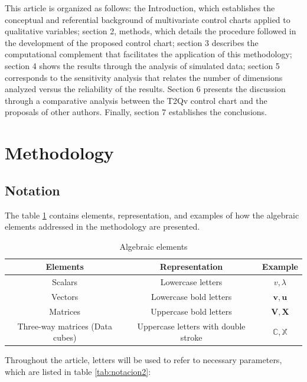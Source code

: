 \documentclass[mathematics,article,submit,moreauthors,pdftex]{mdpi}
\begin{document}
This article is organized as follows: the Introduction, which
establishes the conceptual and referential background of multivariate
control charts applied to qualitative variables; section 2, methods,
which details the procedure followed in the development of the proposed
control chart; section 3 describes the computational complement that
facilitates the application of this methodology; section 4 shows the
results through the analysis of simulated data; section 5 corresponds to
the sensitivity analysis that relates the number of dimensions analyzed
versus the reliability of the results. Section 6 presents the discussion
through a comparative analysis between the T2Qv control chart and the
proposals of other authors. Finally, section 7 establishes the
conclusions.

\hypertarget{methodology}{%
\section{Methodology}\label{methodology}}

\hypertarget{notation}{%
\subsection{Notation}\label{notation}}

The table \ref{tab:notacion} contains elements, representation, and
examples of how the algebraic elements addressed in the methodology are
presented.

\begin{table}[!ht]
\begin{center}
 \begin{tabular}{||c ||c |c ||} 
 \hline
 Elements & Representation & Example \\
 \hline\hline
 Scalars & Lowercase letters & $v,\lambda$\\
\hline
Vectors & Lowercase bold letters & $\mathbf{v},\mathbf{u}$\\
\hline
Matrices & Uppercase bold letters & $\mathbf{V},\mathbf{X}$\\
\hline
Three-way matrices (Data cubes) & Uppercase letters with double stroke & $\mathbb{C},\mathbb{X}$\\
\hline
\end{tabular}\caption{Algebraic elements}
\label{tab:notacion}
\end{center}
\end{table}

Throughout the article, letters will be used to refer to necessary
parameters, which are listed in table \ref{tab:notacion2}:
\end{document}
